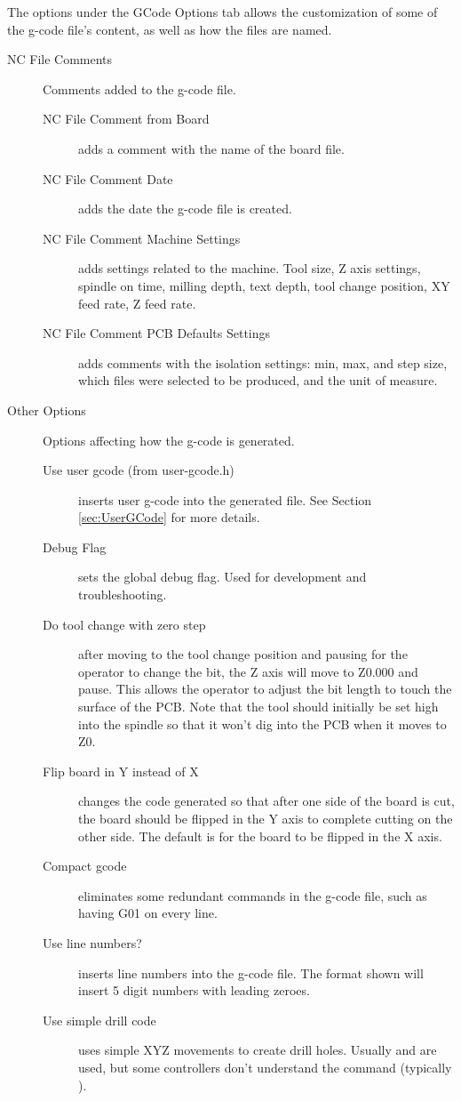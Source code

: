 \documentclass[11pt]{book}
\begin{document}
The options under the GCode Options tab allows the customization of some of the g-code file's content, as well as how the files are named.

\begin{description}
	\item[NC File Comments] Comments added to the g-code file.
	\begin{description}
		\item[NC File Comment from Board] adds a comment with the name of the board file.
		\item[NC File Comment Date] adds the date the g-code file is created.
		\item[NC File Comment Machine Settings] adds settings related to the machine. Tool size, Z axis settings, spindle on time, milling depth, text depth, tool change position, XY feed rate, Z feed rate.
		\item[NC File Comment PCB Defaults Settings] adds comments with the isolation settings: min, max, and step size, which files were selected to be produced, and the unit of measure.
	\end{description}
	
	\item[Other Options] Options affecting how the g-code is generated.
	\begin{description}
		\item[Use user gcode (from user-gcode.h)] inserts user g-code into the generated file. See Section \vref{sec:UserGCode} for more details.
		\item[Debug Flag] sets the global debug flag. Used for development and troubleshooting.
		\item[Do tool change with zero step] after moving to the tool change position and pausing for the operator to change the bit, the Z axis will move to Z0.000 and pause. This allows the operator to adjust the bit length to touch the surface of the PCB. Note that the tool should initially be set high into the spindle so that it won't dig into the PCB when it moves to Z0.
		\item[Flip board in Y instead of X] changes the code generated so that after one side of the board is cut, the board should be flipped in the Y axis to complete cutting on the other side. The default is for the board to be flipped in the X axis.
		\item[Compact gcode] eliminates some redundant commands in the g-code file, such as having G01 on every line.
		\item[Use line numbers?] inserts line numbers into the g-code file. The format shown  will insert 5 digit numbers with leading zeroes.
		\item[Use simple drill code] uses simple XYZ movements to create drill holes. Usually  and  are used, but some controllers don't understand the command (typically ).
	\end{description}
	

\end{description}
\end{document}
